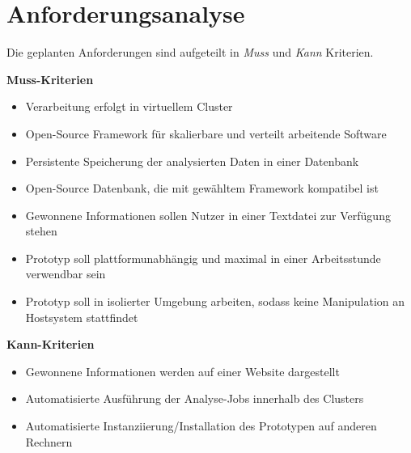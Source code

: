 \chapter{Anforderungsanalyse}
\label{cha:Anforderungsanalyse}

Die geplanten Anforderungen sind aufgeteilt in \textit{Muss} und \textit{Kann} Kriterien.

\textbf{Muss-Kriterien}

\begin{itemize}
\item Verarbeitung erfolgt in virtuellem Cluster
\item Open-Source Framework für skalierbare und verteilt arbeitende Software
\item Persistente Speicherung der analysierten Daten in einer Datenbank
\item Open-Source Datenbank, die mit gewähltem Framework kompatibel ist
\item Gewonnene Informationen sollen Nutzer in einer Textdatei zur Verfügung stehen
\item Prototyp soll plattformunabhängig und maximal in einer Arbeitsstunde verwendbar sein
\item Prototyp soll in isolierter Umgebung arbeiten, sodass keine Manipulation an Hostsystem stattfindet
\end{itemize}

\textbf{Kann-Kriterien}

\begin{itemize}
\item Gewonnene Informationen werden auf einer Website dargestellt
\item Automatisierte Ausführung der Analyse-Jobs innerhalb des Clusters
\item Automatisierte Instanziierung/Installation des Prototypen auf anderen Rechnern 
\end{itemize}